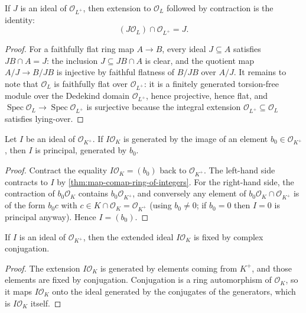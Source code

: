 \begin{theorem}\label{thm:map-comap-ring-of-integers}
  \leanok
If $J$ is an ideal of $\mathcal O_{L^+}$, then extension to $\mathcal O_L$
followed by contraction is the identity:
\[
  (J\mathcal O_L)\cap\mathcal O_{L^+}=J.
\]
\end{theorem}
\begin{proof}\leanok
For a faithfully flat ring map $A \to B$, every ideal $J \subseteq A$
satisfies $JB \cap A = J$: the inclusion $J \subseteq JB \cap A$ is clear,
and the quotient map $A/J \to B/JB$ is injective by faithful flatness of
$B/JB$ over $A/J$.  It remains to note that $\mathcal O_L$ is faithfully
flat over $\mathcal O_{L^+}$: it is a finitely generated torsion-free
module over the Dedekind domain $\mathcal O_{L^+}$, hence projective, hence
flat, and $\operatorname{Spec}\mathcal O_L \to \operatorname{Spec}\mathcal
O_{L^+}$ is surjective because the integral extension $\mathcal O_{L^+}
\subseteq \mathcal O_L$ satisfies lying-over.
\end{proof}

\begin{theorem}\label{thm:is-principal-map-span-singleton}
  \leanok
Let $I$ be an ideal of $\mathcal O_{K^+}$.  If $I\mathcal O_K$ is generated
by the image of an element $b_0\in\mathcal O_{K^+}$, then $I$ is principal,
generated by $b_0$.
\end{theorem}
\begin{proof}\leanok
Contract the equality $I\mathcal O_K=(b_0)$ back to $\mathcal O_{K^+}$.
The left-hand side contracts to $I$ by
\cref{thm:map-comap-ring-of-integers}.  For the right-hand side, the
contraction of $b_0\mathcal O_K$ contains $b_0\mathcal O_{K^+}$, and
conversely any element of $b_0 \mathcal O_K \cap \mathcal O_{K^+}$ is of
the form $b_0 c$ with $c \in K \cap \mathcal O_K = \mathcal O_{K^+}$
(using $b_0 \ne 0$; if $b_0 = 0$ then $I = 0$ is principal anyway).  Hence
$I=(b_0)$.
\end{proof}

\begin{theorem}\label{thm:ideal-map-conj}
  \leanok
If $I$ is an ideal of $\mathcal O_{K^+}$, then the extended ideal
$I\mathcal O_K$ is fixed by complex conjugation.
\end{theorem}
\begin{proof}\leanok
The extension $I\mathcal O_K$ is generated by elements coming from $K^+$,
and those elements are fixed by conjugation.  Conjugation is a ring
automorphism of $\mathcal O_K$, so it maps $I\mathcal O_K$ onto the ideal
generated by the conjugates of the generators, which is $I\mathcal O_K$
itself.
\end{proof}

